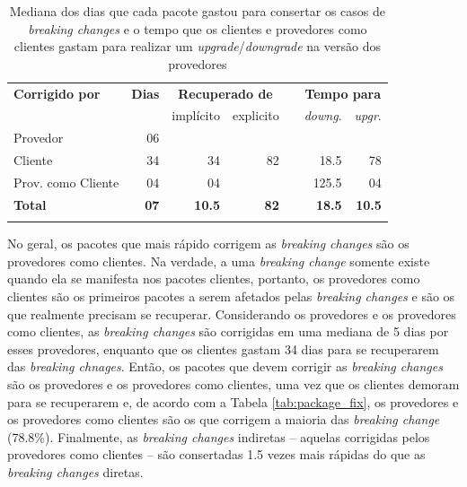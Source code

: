 \begin{table}
	\centering
	\caption{Mediana dos dias que cada pacote gastou para consertar os casos de \textit{breaking changes} e o tempo que os clientes e provedores como clientes gastam para realizar um \textit{upgrade}/\textit{downgrade} na versão dos provedores}
	\begin{tabular}{lrrrrrr} \toprule
		\textbf{Corrigido por} & \textbf{Dias} & \multicolumn{2}{c}{\textbf{Recuperado de}} & \phantom{ab} & \multicolumn{2}{c}{\textbf{Tempo para}}
		\\
		\cmidrule{3-4} \cmidrule{6-7}
		&    & implícito    & explicito    && \textit{downg}.       & \textit{upgr}.       \\ \midrule
		Provedor        & 06 & \textemdash & \textemdash && \textemdash  & \textemdash \\
		Cliente          & 34 & 34          & 82          && 18.5         & 78          \\
		Prov. como Cliente & 04 & 04           & \textemdash && 125.5        & 04           \\ \hline
		\textbf{Total}  & \textbf{07} & \textbf{10.5} & \textbf{82} && \textbf{18.5} & \textbf{10.5} \\
		\bottomrule
		\label{tab:fix_day}
	\end{tabular}
\end{table}

No geral, os pacotes que mais rápido corrigem as \textit{breaking changes} são os provedores como clientes. Na verdade, a uma \textit{breaking change} somente existe quando ela se manifesta nos pacotes clientes, portanto, os provedores como clientes são os primeiros pacotes a serem afetados pelas \textit{breaking changes} e são os que realmente precisam se recuperar. Considerando os provedores e os provedores como clientes, as \textit{breaking changes} são corrigidas em uma mediana de 5 dias por esses provedores, enquanto que os clientes gastam 34 dias para se recuperarem das \textit{breaking chnages}. Então, os pacotes que devem corrigir as \textit{breaking changes} são os provedores e os provedores como clientes, uma vez que os clientes demoram para se recuperarem e, de acordo com a Tabela \ref{tab:package_fix}, os provedores e os provedores como clientes são os que corrigem a maioria das \textit{breaking change} (78.8\%). Finalmente, as \textit{breaking changes} indiretas -- aquelas corrigidas pelos provedores como clientes -- são consertadas 1.5 vezes mais rápidas do que as \textit{breaking changes} diretas.

